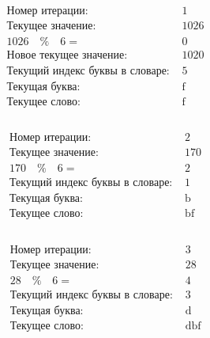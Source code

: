 \documentclass[letterpaper, 11pt]{extarticle}
\begin{document}
\begin{multicols}{2}
    \begin{align*}
        \begin{aligned}
            & \text{Номер итерации: }&1\\
            & \text{Текущее значение: }&1026\\
            & 1026 \quad \% \quad 6 =& 0 \\
            & \text{Новое текущее значение: }&1020\\
            & \text{Текущий индекс буквы в словаре: }&5\\
            & \text{Текущая буква: }& \text{f}\\
            & \text{Текущее слово: }& \text{f}\\
        \end{aligned}
    \end{align*}

    \begin{align*}
        \begin{aligned}
            & \text{Номер итерации: }&2\\
            & \text{Текущее значение: }&170\\
            & 170 \quad \% \quad 6 =& 2 \\
            & \text{Текущий индекс буквы в словаре: }&1\\
            & \text{Текущая буква: }& \text{b}\\
            & \text{Текущее слово: }& \text{bf}\\
        \end{aligned}
    \end{align*}
    
    \begin{align*}
        \begin{aligned}
            & \text{Номер итерации: }&3\\
            & \text{Текущее значение: }&28\\
            & 28 \quad \% \quad 6 =& 4 \\
            & \text{Текущий индекс буквы в словаре: }&3\\
            & \text{Текущая буква: }& \text{d}\\
            & \text{Текущее слово: }& \text{dbf}\\
        \end{aligned}
    \end{align*}


\end{multicols}
\end{document}

